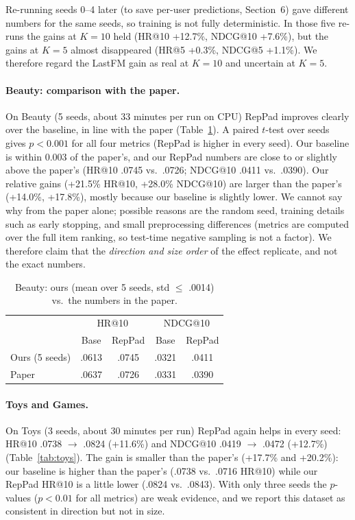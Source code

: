 \documentclass[11pt]{article}
\begin{document}
Re-running seeds 0--4 later (to save per-user predictions, Section~6) gave different
numbers for the same seeds, so training is not fully deterministic. In those five re-runs the
gains at $K{=}10$ held (HR@10 +12.7\%, NDCG@10 +7.6\%), but the gains at $K{=}5$ almost
disappeared (HR@5 +0.3\%, NDCG@5 +1.1\%). We therefore regard the LastFM gain as
real at $K{=}10$ and uncertain at $K{=}5$.

\paragraph{Beauty: comparison with the paper.}
On Beauty (5 seeds, about 33 minutes per run on CPU) RepPad improves clearly
over the baseline, in line with the paper (Table~\ref{tab:beauty}). A paired $t$-test over
seeds gives $p<0.001$ for all four metrics (RepPad is higher in every seed). Our
baseline is within 0.003 of the paper's, and our RepPad numbers are close to or slightly above
the paper's (HR@10 .0745 vs.\ .0726; NDCG@10 .0411 vs.\ .0390). Our relative gains
(+21.5\% HR@10, +28.0\% NDCG@10) are larger than the paper's (+14.0\%, +17.8\%),
mostly because our baseline is slightly lower. We cannot say why from the paper alone;
possible reasons are the random seed, training details such as early stopping, and small
preprocessing differences (metrics are computed over the full item ranking, so test-time
negative sampling is not a factor). We therefore claim that the \emph{direction and size
order} of the effect replicate, and not the exact numbers.

\begin{table}[t]
\centering\small
\begin{tabular}{lcccc}
\hline
 & \multicolumn{2}{c}{HR@10} & \multicolumn{2}{c}{NDCG@10} \\
 & Base & RepPad & Base & RepPad \\
\hline
Ours (5 seeds) & .0613 & .0745 & .0321 & .0411 \\
Paper & .0637 & .0726 & .0331 & .0390 \\
\hline
\end{tabular}
\caption{Beauty: ours (mean over 5 seeds, std $\le$ .0014) vs.\ the numbers in the paper.}
\label{tab:beauty}
\end{table}

\paragraph{Toys and Games.}
On Toys (3 seeds, about 30 minutes per run) RepPad again helps in every seed:
HR@10 .0738 $\to$ .0824 (+11.6\%) and NDCG@10 .0419 $\to$ .0472 (+12.7\%)
(Table~\ref{tab:toys}). The gain is smaller than the paper's (+17.7\% and +20.2\%): our baseline
is higher than the paper's (.0738 vs.\ .0716 HR@10) while our RepPad HR@10 is a little lower
(.0824 vs.\ .0843). With only three seeds the $p$-values ($p<0.01$ for all metrics)
are weak evidence, and we report this dataset as consistent in direction but not
in size.
\end{document}
